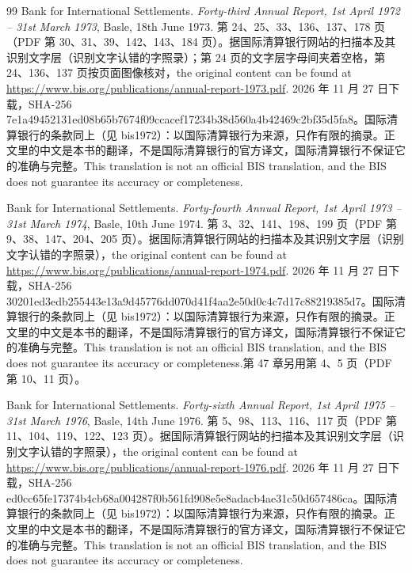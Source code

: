 \begin{thebibliography}{99}
 Bank for International Settlements. \emph{Forty-third Annual Report, 1st April 1972 -- 31st March 1973}, Basle, 18th June 1973. 第 24、25、33、136、137、178 页（PDF 第 30、31、39、142、143、184 页）。据国际清算银行网站的扫描本及其识别文字层（识别文字认错的字照录）；第 24 页的文字层字母间夹着空格，第 24、136、137 页按页面图像核对，the original content can be found at \url{https://www.bis.org/publications/annual-report-1973.pdf}. 2026 年 11 月 27 日下载，SHA-256 7e1a49452131ed08b65b7674f09ccacef17234b38d560a4b42469c2bf35d5fa8。国际清算银行的条款同上（见 bis1972）：以国际清算银行为来源，只作有限的摘录。正文里的中文是本书的翻译，不是国际清算银行的官方译文，国际清算银行不保证它的准确与完整。This translation is not an official BIS translation, and the BIS does not guarantee its accuracy or completeness.

 Bank for International Settlements. \emph{Forty-fourth Annual Report, 1st April 1973 -- 31st March 1974}, Basle, 10th June 1974. 第 3、32、141、198、199 页（PDF 第 9、38、147、204、205 页）。据国际清算银行网站的扫描本及其识别文字层（识别文字认错的字照录），the original content can be found at \url{https://www.bis.org/publications/annual-report-1974.pdf}. 2026 年 11 月 27 日下载，SHA-256 30201ed3edb255443e13a9d45776dd070d41f4aa2e50d0c4c7d17c88219385d7。国际清算银行的条款同上（见 bis1972）：以国际清算银行为来源，只作有限的摘录。正文里的中文是本书的翻译，不是国际清算银行的官方译文，国际清算银行不保证它的准确与完整。This translation is not an official BIS translation, and the BIS does not guarantee its accuracy or completeness.第 47 章另用第 4、5 页（PDF 第 10、11 页）。

 Bank for International Settlements. \emph{Forty-sixth Annual Report, 1st April 1975 -- 31st March 1976}, Basle, 14th June 1976. 第 5、98、113、116、117 页（PDF 第 11、104、119、122、123 页）。据国际清算银行网站的扫描本及其识别文字层（识别文字认错的字照录），the original content can be found at \url{https://www.bis.org/publications/annual-report-1976.pdf}. 2026 年 11 月 27 日下载，SHA-256 ed0cc65fe17374b4cb68a004287f0b561fd908e5e8adacb4ae31c50d657486ca。国际清算银行的条款同上（见 bis1972）：以国际清算银行为来源，只作有限的摘录。正文里的中文是本书的翻译，不是国际清算银行的官方译文，国际清算银行不保证它的准确与完整。This translation is not an official BIS translation, and the BIS does not guarantee its accuracy or completeness.


\end{thebibliography}
